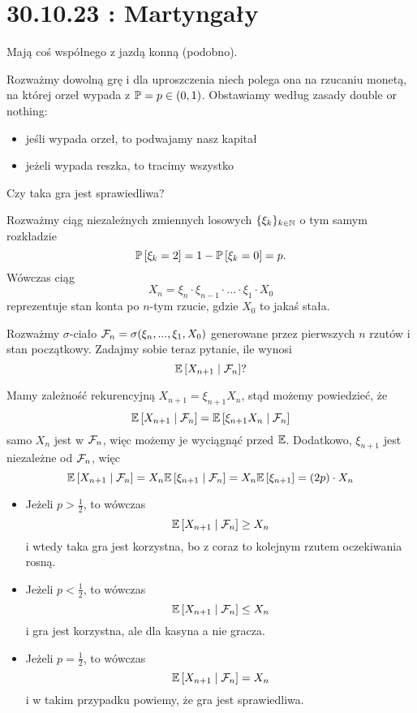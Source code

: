\section{30.10.23 : Martyngały}

Mają coś współnego z jazdą konną (podobno).

\begin{example}
  \item Rozważmy dowolną grę i dla uproszczenia niech polega ona na rzucaniu monetą, na której orzeł wypada z $\prob = p \in (0,1)$. Obstawiamy według zasady double or nothing:
    \begin{itemize}
      \item jeśli wypada orzeł, to podwajamy nasz kapitał
      \item jeżeli wypada reszka, to tracimy wszystko
    \end{itemize}
    Czy taka gra jest sprawiedliwa?

    Rozważmy ciąg niezależnych zmiennych losowych $\{\xi_k\}_{k\in\operatorname{\mathbb{N}}}$ o tym samym rozkładzie
    $$\prob{\xi_k=2}=1-\prob{\xi_k=0}=p.$$
    Wówczas ciąg
    $$X_n=\xi_n\cdot\xi_{n-1}\cdot...\cdot\xi_1\cdot X_0$$
    reprezentuje stan konta po $n$-tym rzucie, gdzie $X_0$ to jakaś stała.

    Rozważmy $\sigma$-ciało $\mathcal{F}_n=\sigma(\xi_n,...,\xi_1,X_0)$ generowane przez pierwszych $n$ rzutów i stan początkowy. Zadajmy sobie teraz pytanie, ile wynosi
    $$\expected{X_{n+1}}{\set{F}_n}?$$

    Mamy zależność rekurencyjną $X_{n+1}=\xi_{n+1}X_n$, stąd możemy powiedzieć, że
    $$\expected{X_{n+1}}{\set{F}_n}=\expected{\xi_{n+1}X_n}{\set{F}_n}$$
    samo $X_n$ jest w $\mathcal{F}_n$, więc możemy je wyciągnąć przed $\expected$. Dodatkowo, $\xi_{n+1}$ jest niezależne od $\mathcal{F}_n$, więc
    $$\expected{X_{n+1}}{\set{F}_n}=X_n\expected{\xi_{n+1}}{\set{F}_n}=X_n\expected{\xi_{n+1}}=(2p)\cdot X_n$$

    \begin{itemize}
      \item Jeżeli $p>\frac{1}{2}$, to wówczas
        $$\expected{X_{n+1}}{\set{F}_n}\geq X_n$$
        i wtedy taka gra jest korzystna, bo z coraz to kolejnym rzutem oczekiwania rosną.
      \item Jeżeli $p<\frac{1}{2}$, to wówczas
        $$\expected{X_{n+1}}{\set{F}_n}\leq X_n$$
        i gra jest korzystna, ale dla kasyna a nie gracza.
      \item Jeżeli $p=\frac{1}{2}$, to wówczas
        $$\expected{X_{n+1}}{\set{F}_n}=X_n$$
        i w takim przypadku powiemy, że gra jest sprawiedliwa.
    \end{itemize}
\end{example}

